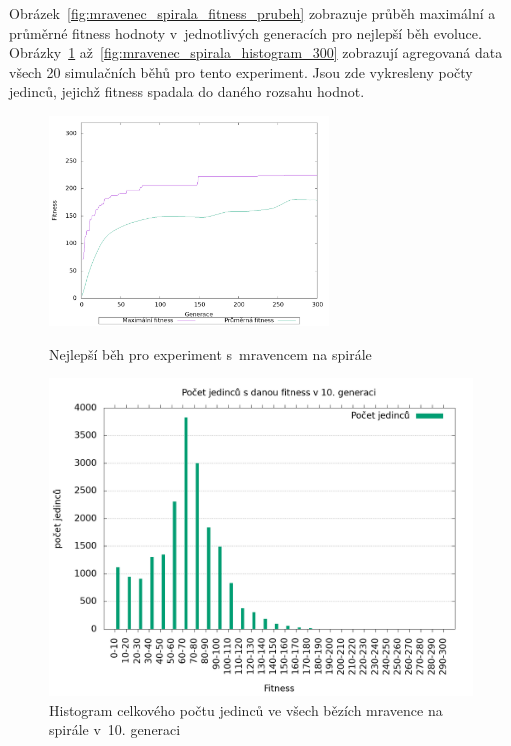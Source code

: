 Obrázek~\ref{fig:mravenec_spirala_fitness_prubeh} zobrazuje průběh maximální a průměrné fitness hodnoty v~jednotlivých generacích pro nejlepší běh evoluce.
Obrázky~\ref{fig:mravenec_spirala_histogram_10} až~\ref{fig:mravenec_spirala_histogram_300} zobrazují agregovaná data všech 20 simulačních běhů pro tento experiment.
Jsou zde vykresleny počty jedinců, jejichž fitness spadala do daného rozsahu hodnot.

\begin{figure}[h]
    \begin{minipage}[c]{0.48\linewidth}
    {\includegraphics[width=20em]{obrazky/mravenec_spirala_fitness_prubeh.png}}
        \caption{
        Nejlepší běh pro experiment s~mravencem na spirále
        }
        \label{fig:mravenec_spirala_fitness_prubeh}
    \end{minipage}
    \hfill
    \begin{minipage}[c]{0.48\linewidth}
        \includegraphics[width=\linewidth]{obrazky/mravenec_spirala_fitnessHistogram10.png}
        \caption{Histogram celkového počtu jedinců ve všech bězích mravence na spirále v~10. generaci}
        \label{fig:mravenec_spirala_histogram_10}
    \end{minipage}
\end{figure}

